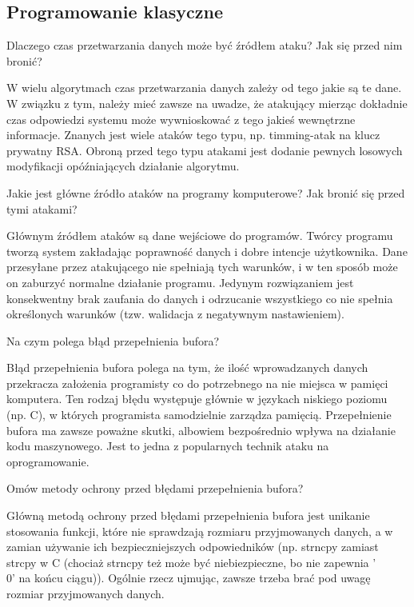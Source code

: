 \documentclass[answers,11pt]{exam}
\begin{document}
\subsection{Programowanie klasyczne}
\begin{questions}

\question Dlaczego czas przetwarzania danych może być źródłem ataku? Jak się przed nim bronić?
\begin{solution}
W wielu algorytmach czas przetwarzania danych zależy od tego jakie są te dane. W związku z tym, należy mieć zawsze na uwadze, że atakujący mierząc dokładnie czas odpowiedzi systemu może wywnioskować z tego jakieś wewnętrzne informacje. Znanych jest wiele ataków tego typu, np. timming-atak na klucz prywatny RSA.
Obroną przed tego typu atakami jest dodanie pewnych losowych modyfikacji opóźniających działanie algorytmu.  
\end{solution}

\question Jakie jest główne źródło ataków na programy komputerowe? Jak bronić się przed tymi atakami?
\begin{solution}
Głównym źródłem ataków są dane wejściowe do programów. Twórcy programu tworzą system zakładając poprawność danych i dobre intencje użytkownika. Dane przesyłane przez atakującego nie spełniają tych warunków, i w ten sposób może on zaburzyć normalne działanie programu. 
Jedynym rozwiązaniem jest konsekwentny brak zaufania do danych i odrzucanie wszystkiego co nie spełnia określonych warunków (tzw. walidacja z negatywnym nastawieniem).
\end{solution}


\question Na czym polega błąd przepełnienia bufora?
\begin{solution}
Błąd przepełnienia bufora polega na tym, że ilość wprowadzanych danych przekracza założenia programisty co do potrzebnego na nie miejsca w pamięci komputera. Ten rodzaj błędu występuje głównie w językach niskiego poziomu (np. C), w których programista samodzielnie zarządza pamięcią. Przepełnienie bufora ma zawsze poważne skutki, albowiem bezpośrednio wpływa na działanie kodu maszynowego. Jest to jedna z popularnych technik ataku na oprogramowanie. 
\end{solution}

\question Omów metody ochrony przed błędami przepełnienia bufora?
\begin{solution}
Główną metodą ochrony przed błędami przepełnienia bufora jest unikanie stosowania funkcji, które nie sprawdzają rozmiaru przyjmowanych danych, a w zamian używanie ich bezpieczniejszych odpowiedników (np. strncpy zamiast strcpy w C (chociaż strncpy też może być niebiezpieczne, bo nie zapewnia '\\0' na końcu ciągu)). Ogólnie rzecz ujmując, zawsze trzeba brać pod uwagę rozmiar przyjmowanych danych. 
\end{solution}


\end{questions}
\end{document}
